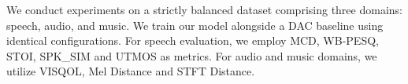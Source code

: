 \documentclass[11pt]{article}
\begin{document}




We conduct experiments on a strictly balanced dataset comprising three domains: speech, audio, and music. We train our model alongside a DAC baseline using identical configurations. For speech evaluation, we employ MCD, WB-PESQ, STOI, SPK\_SIM and UTMOS as metrics. For audio and music domains, we utilize VISQOL, Mel Distance and STFT Distance.
\end{document}
